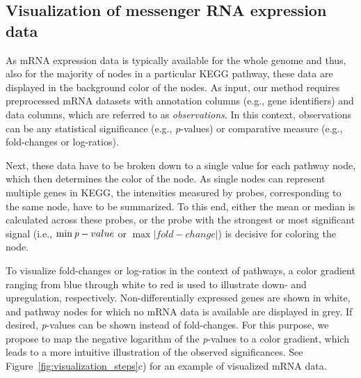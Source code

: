 \documentclass{bioinfo}
\begin{document}
\subsection{Visualization of messenger RNA expression data}

As mRNA expression data is typically available for the whole genome and thus, also for the majority
of nodes in a particular KEGG pathway, these data are displayed in the background color of the
nodes.
%
As input, our method requires preprocessed mRNA datasets with annotation columns (e.g.,
gene identifiers) and data columns, which are referred to as \emph{observations}. In this context,
observations can be any statistical significance (e.g., \emph{p}-values) or comparative measure
(e.g., fold-changes or log-ratios).

Next, these data have to be broken down to a single value for each pathway node, which then
determines the color of the node. As single nodes can represent multiple genes in KEGG, the
intensities measured by probes, corresponding to the same node, have to be summarized. To this end,
either the mean or median is calculated across these probes, or the probe
with the strongest or most significant signal (i.e., $\min\emph{p}-value$ or $\max|fold-change|$) is
decisive for coloring the node.

To visualize fold-changes or log-ratios in the context of pathways, a color gradient ranging from
blue through white to red is used to illustrate down- and upregulation,
respectively. Non-differentially expressed genes are shown in white, and pathway nodes for which no
mRNA data is available are displayed in grey. If desired, \emph{p}-values can be shown instead of
fold-changes. For this purpose, we propose to map the negative logarithm of the \emph{p}-values to a
color gradient, which leads to a more intuitive illustration of the observed significances. See
Figure~\ref{fig:visualization_steps}c) for an example of visualized mRNA data.

\end{document}
